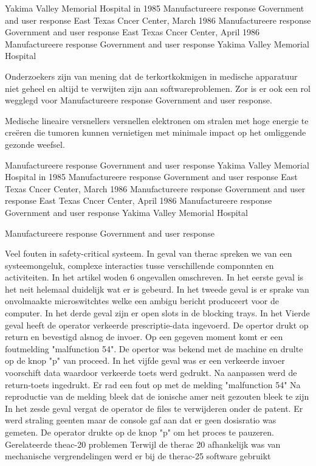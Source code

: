 Yakima Valley Memorial Hospital in 1985
Manufactureere response
Government and user response
East Texas Cncer Center, March 1986
Manufactureere response
Government and user response
East Texas Cncer Center, April 1986
Manufactureere response
Government and user response
Yakima Valley Memorial Hospital

Onderzoekers zijn van mening dat de terkortkokmigen in medische apparatuur niet geheel en altijd te verwijten zijn aan softwareproblemen. Zor is er ook een rol wegglegd voor Manufactureere response
Government and user response.

Medische lineaire versnellers versnellen elektronen om stralen met hoge energie te creëren die tumoren kunnen vernietigen met minimale impact op het omliggende gezonde weefsel.

Manufactureere response
Government and user response
Yakima Valley Memorial Hospital in 1985
Manufactureere response
Government and user response
East Texas Cncer Center, March 1986
Manufactureere response
Government and user response
East Texas Cncer Center, April 1986
Manufactureere response
Government and user response
Yakima Valley Memorial Hospital

Manufactureere response
Government and user response


Veel fouten in safety-critical systeem. In geval van therac spreken we van een systeemongeluk, complexe interacties tusse verschillende componnten en activiteiten. In het artikel woden 6 ongevallen omschreven.
In het eerste geval is het neit helemaal duidelijk wat er is gebeurd.
In het tweede geval is er sprake van onvolmaakte microswitchtes welke	 een ambigu bericht produceert voor de computer.
In het derde geval zijn er open slots in de blocking trays.
In het Vierde geval  heeft de operator verkeerde prescriptie-data ingevoerd. De opertor drukt op return en bevestigd alsnog de invoer. Op een gegeven moment komt er een foutmelding "malfunction 54". De opertor was bekend met de machine en drulte op de knop "p" van proceed.
In het vijfde geval was er een verkeerde invoer voorschift data waardoor verkeerde toets werd gedrukt. Na aanpassen werd de return-toets ingedrukt. Er rad een fout op met de melding "malfunction 54" Na reproductie van de melding bleek dat de ionische amer neit gezouten bleek te zijn
In het zesde geval vergat de operator de files te verwijderen onder de patent. Er werd straling geenten maar de console gaf aan dat er geen dosisratio was gemeten. De operator drukte op de knop "p" om het proces te pauzeren.
Gerelateerde theac-20 problemen
Terwijl de therac 20 afhankelijk was van mechanische vergrendelingen werd er bij de therac-25 software gebruikt

